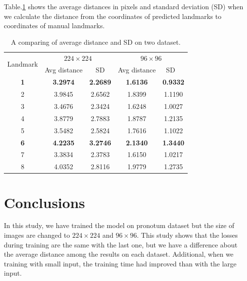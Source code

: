 \documentclass[12pt,a4paper]{article}
\begin{document}
Table.\ref{tab3} shows the average distances in pixels and standard deviation (SD) when we calculate the distance from the coordinates of predicted landmarks to coordinates of manual landmarks.
\begin{table}[htbp]
\centering
\begin{tabular}{ | c | c | c | c | c | }
\hline
	\multicolumn{1}{|c|}{\multirow{2}{*}{Landmark}} & \multicolumn{2}{c|}{$224 \times 224$} &  \multicolumn{2}{c|}{$96 \times 96$}  \\ \cline{2-5}
	 & Avg distance & SD & Avg distance & SD \  \\ \hline
	\textbf{1} & \textbf{3.2974} & \textbf{2.2689} & \textbf{1.6136} & \textbf{0.9332
} \\ \hline
	2 & 3.9845 & 2.6562 & 1.8399 & 1.1190 \\ \hline
	3 & 3.4676 & 2.3424 & 1.6248 &	1.0027 \\ \hline
	4 & 3.8779 & 2.7883 & 1.8787	& 1.2135 \\ \hline
	5 & 3.5482 & 2.5824 & 1.7616 &	1.1022 \\ \hline
	\textbf{6} & \textbf{4.2235} & \textbf{3.2746} & \textbf{2.1340} &\textbf{1.3440} \\ \hline
	7 & 3.3834 & 2.3783 & 1.6150 &	1.0217 \\ \hline
	8 & 4.0352 & 2.8116 & 1.9779 &	1.2735 \\ \hline	
\end{tabular}
\caption{\small{A comparing of average distance and SD on two dataset.}}
\label{tab3}
\end{table}


\section{Conclusions}
In this study, we have trained the model on pronotum dataset but the size of images are changed to $224 \times 224$ and $96 \times 96$. This study shows that the losses during training are the same with the last one, but we have a difference about the average distance among the results on each dataset. Additional, when we training with small input, the training time had improved than with the large input.


\end{document}
